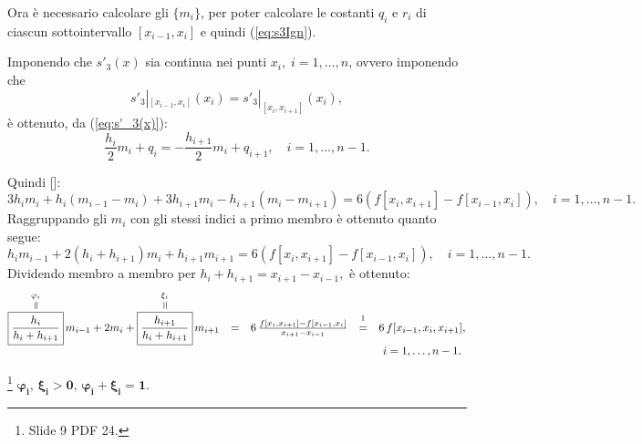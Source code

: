 

Ora è necessario calcolare gli $\{m_i\}$, per poter calcolare le costanti $q_i$ e $r_i$ di ciascun sottointervallo $[x_{i-1},x_i]$ e quindi (\ref{eq:s3Ign}).

Imponendo che $s'_3(x)$ sia continua nei punti $x_i,\; i=1,\hdots,n$, ovvero imponendo che
\begin{equation*}
    s'_3|_{[x_{i-1}, x_i]}(x_i)=s'_3|_{[x_i, x_{i+1}]}(x_i),
\end{equation*}
è ottenuto, da (\ref{eq:s'_3(x)}):
\begin{equation*}
    \frac{h_i}{2}m_i+q_i=-\frac{h_{i+1}}{2}m_i+q_{i+1},\quad i=1,\hdots,n-1.
\end{equation*}

Quindi [\footnotemark]:
\begin{equation*}
    3h_im_i+h_i(m_{i-1}-m_i)+3h_{i+1}m_i-h_{i+1}(m_i-m_{i+1})=6\left(f[x_i,x_{i+1}]-f[x_{i-1},x_i]\right),\quad i=1,\hdots,n-1.
\end{equation*}
Raggruppando gli $m_i$ con gli stessi indici a primo membro è ottenuto quanto segue:
\begin{equation*}
    h_im_{i-1}+2(h_i+h_{i+1})m_i+h_{i+1}m_{i+1}=6(f[x_i,x_{i+1}]-f[x_{i-1},x_i]),\quad i=1,\hdots,n-1.
\end{equation*}
Dividendo membro a membro per $h_i+h_{i+1}=x_{i+1}-x_{i-1},$ è ottenuto:
\begin{equation}\label{eq:eqCalcMi}
    \begin{matrix}
        \equaltoup{\boxed{\frac{h_i}{h_i+h_{i+1}}}}{\varphi_i}\,m_{i-1}+2m_i+\equaltoup{\boxed{\frac{h_{i+1}}{h_i+h_{i+1}}}}{\xi_i}\,m_{i+1}&=&6\,\frac{f[x_i,x_{i+1}]-f[x_{i-1},x_i]}{x_{i+1}-x_{i-1}}&\overset{\footnotemark}{=}&6\,f[x_{i-1},x_i,x_{i+1}],\\
        && && i=1,\hdots,n-1.
    \end{matrix}
\end{equation} 

\begin{remark}\label{re:varphi+xi=1}\footnote{Slide 9 PDF 24.}
    $\boldsymbol{\varphi_i,\, \xi_i>0,\, \varphi_i+\xi_i=1.}$
\end{remark}

